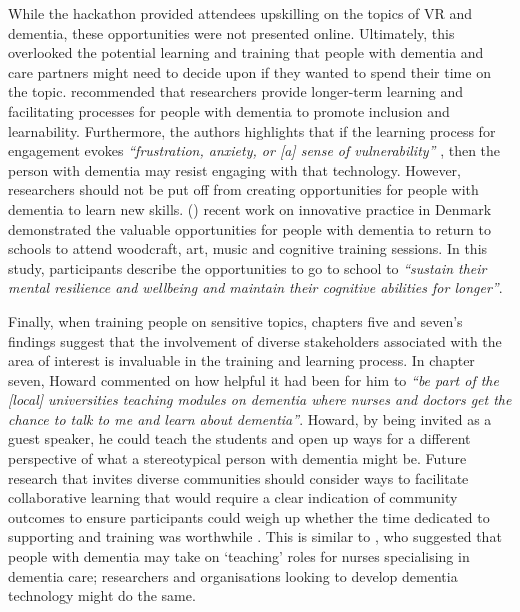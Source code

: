 While the hackathon provided attendees upskilling on the topics of VR and dementia, these opportunities were not presented online. Ultimately, this overlooked the potential learning and training that people with dementia and care partners might need to decide upon if they wanted to spend their time on the topic. \cite{hwang2020exploring} recommended that researchers provide longer-term learning and facilitating processes for people with dementia to promote inclusion and learnability. Furthermore, the authors highlights that if the learning process for engagement evokes \textit{``frustration, anxiety, or [a] sense of vulnerability''} \citep[p.46:26]{hwang2020exploring}, then the person with dementia may resist engaging with that technology. However, researchers should not be put off from creating opportunities for people with dementia to learn new skills. \citeauthor{ward2020going} (\citeyear{ward2020going}) recent work on innovative practice in Denmark demonstrated the valuable opportunities for people with dementia to return to schools to attend woodcraft, art, music and cognitive training sessions. In this study, participants describe the opportunities to go to school to \textit{``sustain their mental resilience and wellbeing and maintain their cognitive abilities for longer''}.

Finally, when training people on sensitive topics, chapters five and seven's findings suggest that the involvement of diverse stakeholders associated with the area of interest is invaluable in the training and learning process. In chapter seven, Howard commented on how helpful it had been for him to \textit{``be part of the [local] universities teaching modules on dementia where nurses and doctors get the chance to talk to me and learn about dementia''}. Howard, by being invited as a guest speaker, he could teach the students and open up ways for a different perspective of what a stereotypical person with dementia might be. Future research that invites diverse communities should consider ways to facilitate collaborative learning that would require a clear indication of community outcomes to ensure participants could weigh up whether the time dedicated to supporting and training was worthwhile \citep{hayes2020inclusive}. This is similar to \cite{skog2000patient}, who suggested that people with dementia may take on `teaching' roles for nurses specialising in dementia care; researchers and organisations looking to develop dementia technology might do the same.

